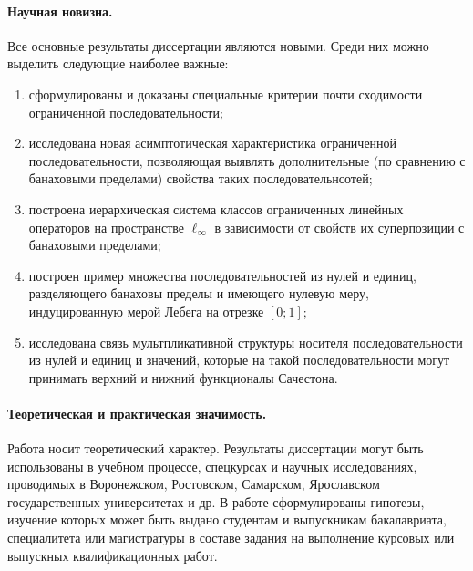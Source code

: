 \paragraph{Научная новизна.}
Все основные результаты диссертации являются новыми.
Среди них можно выделить следующие наиболее важные:
\begin{enumerate}
	\item
		сформулированы и доказаны специальные критерии почти сходимости
		ограниченной последовательности;
	\item
		исследована новая асимптотическая характеристика ограниченной последовательности,
		позволяющая выявлять дополнительные (по сравнению с банаховыми пределами)
		свойства таких последовательнсотей;
	\item
		построена иерархическая система классов ограниченных линейных операторов
		на пространстве $\ell_\infty$ в зависимости от свойств их суперпозиции с банаховыми пределами;
	\item
		построен пример множества последовательностей из нулей и единиц, разделяющего банаховы пределы
		и имеющего нулевую меру, индуцированную мерой Лебега на отрезке $[0;1]$;
	\item
		исследована связь мультпликативной структуры носителя последовательности из нулей и единиц
		и значений, которые на такой последовательности могут принимать верхний и нижний функционалы Сачестона.
\end{enumerate}


\paragraph{Теоретическая и практическая значимость.}
Работа носит теоретический характер.
Результаты диссертации могут быть использованы в учебном процессе, спецкурсах и научных исследованиях,
проводимых в Воронежском, Ростовском, Самарском, Ярославском государственных университетах и др.
В работе сформулированы гипотезы, изучение которых может быть выдано студентам и выпускникам бакалавриата, специалитета или магистратуры
в составе задания на выполнение курсовых или выпускных квалификационных работ.


